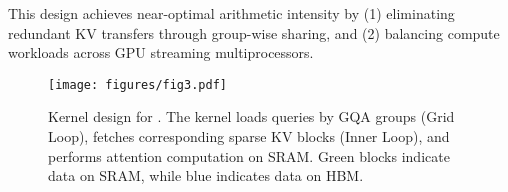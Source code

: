 This design achieves near-optimal arithmetic intensity by (1) eliminating redundant KV transfers through group-wise sharing, and (2) balancing compute workloads across GPU streaming multiprocessors. 


\begin{figure}[h] 
\centering 
\texttt{[image: figures/fig3.pdf]}
\caption{Kernel design for \method{}. The kernel loads queries by GQA groups (Grid Loop), fetches corresponding sparse KV blocks (Inner Loop), and performs attention computation on SRAM. Green blocks indicate data on SRAM, while blue indicates data on HBM.}
\label{fig:fig3} 
\end{figure}